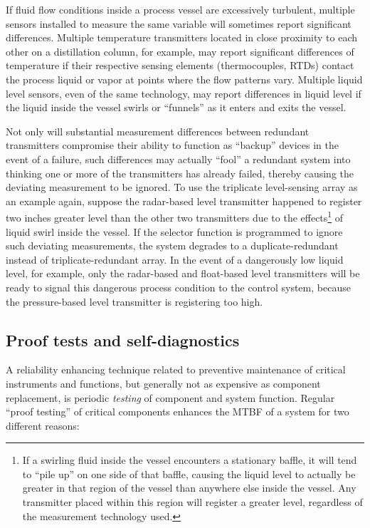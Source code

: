 If fluid flow conditions inside a process vessel are excessively turbulent, multiple sensors installed to measure the same variable will sometimes report significant differences.  Multiple temperature transmitters located in close proximity to each other on a distillation column, for example, may report significant differences of temperature if their respective sensing elements (thermocouples, RTDs) contact the process liquid or vapor at points where the flow patterns vary.  Multiple liquid level sensors, even of the same technology, may report differences in liquid level if the liquid inside the vessel swirls or ``funnels'' as it enters and exits the vessel.

Not only will substantial measurement differences between redundant transmitters compromise their ability to function as ``backup'' devices in the event of a failure, such differences may actually ``fool'' a redundant system into thinking one or more of the transmitters has already failed, thereby causing the deviating measurement to be ignored.  To use the triplicate level-sensing array as an example again, suppose the radar-based level transmitter happened to register two inches greater level than the other two transmitters due to the effects\footnote{If a swirling fluid inside the vessel encounters a stationary baffle, it will tend to ``pile up'' on one side of that baffle, causing the liquid level to actually be greater in that region of the vessel than anywhere else inside the vessel.  Any transmitter placed within this region will register a greater level, regardless of the measurement technology used.} of liquid swirl inside the vessel.  If the selector function is programmed to ignore such deviating measurements, the system degrades to a duplicate-redundant instead of triplicate-redundant array.  In the event of a dangerously low liquid level, for example, only the radar-based and float-based level transmitters will be ready to signal this dangerous process condition to the control system, because the pressure-based level transmitter is registering too high.








\filbreak
\subsection{Proof tests and self-diagnostics}

A reliability enhancing technique related to preventive maintenance of critical instruments and functions, but generally not as expensive as component replacement, is periodic \textit{testing} of component and system function.  Regular ``proof testing'' of critical components enhances the MTBF of a system for two different reasons:  

